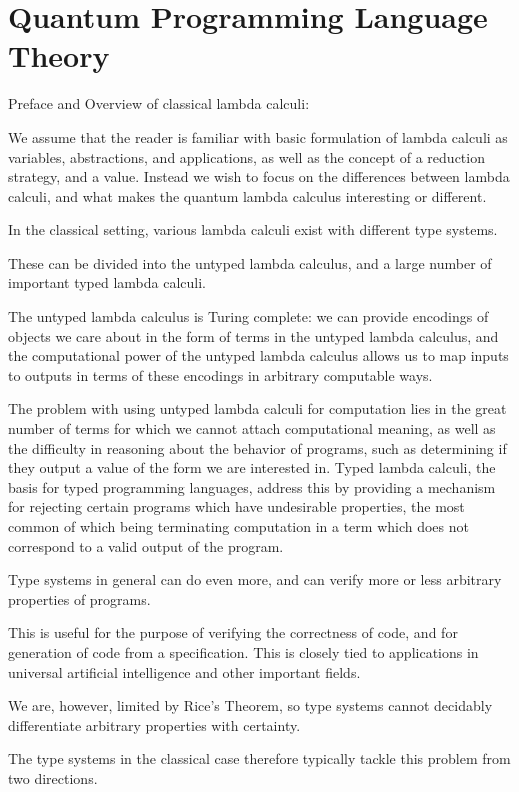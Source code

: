 \documentclass{article}
\theoremstyle{plain}
\theoremstyle{definition}
\theoremstyle{remark}
\begin{document}
\section{Quantum Programming Language Theory}




Preface and Overview of classical lambda calculi:
$$$$

We assume that the reader is familiar with basic formulation of lambda calculi as variables, abstractions, and applications,
as well as the concept of a reduction strategy, and a value. Instead we wish to focus on the differences between lambda calculi, and what makes the quantum lambda calculus interesting or different.

In the classical setting, various lambda calculi exist with different type systems.

These can be divided into the untyped lambda calculus, and a large number of important typed lambda calculi.

The untyped lambda calculus is Turing complete: we can provide encodings of objects we care about in the form of terms in the untyped lambda calculus,
and the computational power of the untyped lambda calculus allows us to map inputs to outputs in terms of these encodings in arbitrary computable ways.

The problem with using untyped lambda calculi for computation lies in the great number of terms for which we cannot attach computational meaning, as well as the difficulty in reasoning about the behavior of programs, such as determining if they output a value of the form we are interested in.
Typed lambda calculi, the basis for typed programming languages, address this by providing a mechanism for rejecting certain programs which have undesirable properties, the most common of which being terminating computation in a term which does not correspond to a valid output of the program.

Type systems in general can do even more, and can verify more or less arbitrary properties of programs.

This is useful for the purpose of verifying the correctness of code, and for generation of code from a specification.
This is closely tied to applications in universal artificial intelligence and other important fields.

We are, however, limited by Rice's Theorem, so type systems cannot decidably differentiate arbitrary properties with certainty.

The type systems in the classical case therefore typically tackle this problem from two directions.
\end{document}
